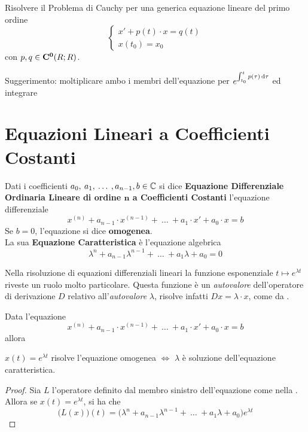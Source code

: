 \begin{exercise}
	Risolvere il Problema di Cauchy per una generica equazione lineare del primo ordine
	\begin{equation*}
	\begin{cases}
	x' + p(t) \cdot x = q(t)\\
	x(t_0) = x_0
	\end{cases}
	\end{equation*}
	con $p,q \in \mathbf{C^{0}}(R;R)$.
	\begin{solution}
		Suggerimento: moltiplicare ambo i membri dell'equazione per $e^{\int_{t_0}^{t}p(\tau)\,\mathrm{d}{\tau}}$ ed integrare
	\end{solution}
\end{exercise}
\cbend

\cbstart
\newpage
\section{Equazioni Lineari a Coefficienti Costanti}
\begin{definition}
	Dati i coefficienti $a_0,\:a_1,\:\dotsc\:,a_{n-1},b \in \mathbb{C}$ si dice \textbf{Equazione Differenziale Ordinaria Lineare di ordine $\boldsymbol{n}$ a Coefficienti Costanti} l'equazione differenziale
	\[x^{(n)} + a_{n-1} \cdot x^{(n-1)} +\:\ldots\:+ a_1 \cdot x' + a_0 \cdot x = b\]
	Se $b=0$, l'equazione si dice \textbf{omogenea}.\\
	La sua \textbf{Equazione Caratteristica} è l'equazione algebrica
	\[\lambda^n + a_{n-1} \lambda^{n-1} +\:\ldots\:+ a_1 \lambda + a_0 = 0\]
\end{definition}
\begin{observation}
	Nella risoluzione di equazioni differenziali lineari la funzione esponenziale $t \mapsto e^{\lambda t}$ riveste un ruolo molto particolare. Questa funzione è un \textit{autovalore} dell'operatore di derivazione $D$ relativo all'\textit{autovalore} $\lambda$, risolve infatti $Dx=\lambda \cdot x$, come da .
\end{observation}
\begin{proposition}
	Data l'equazione
	\[x^{(n)} + a_{n-1} \cdot x^{(n-1)} +\:\ldots\:+ a_1 \cdot x'+a_0 \cdot x = b\]
	allora
	\begin{center}
		$x(t)=e^{\lambda t}$ risolve l'equazione omogenea $\iff$ $\lambda$ è soluzione dell'equazione caratteristica.
	\end{center}
	\begin{proof}
		Sia $L$ l'operatore definito dal membro sinistro dell'equazione come nella . Allora se $x(t) = e^{\lambda t}$, si ha che
		\[\bigl(L(x)\bigr)(t) = \bigl( \lambda^n + a_{n-1}\lambda^{n-1} +\:\ldots\:+ a_1 \lambda + a_0 \bigr) e^{\lambda t}\]
	\end{proof}
\end{proposition}
